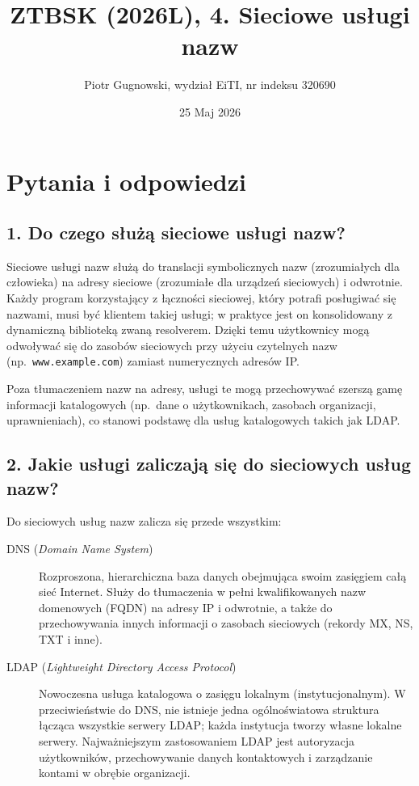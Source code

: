 \documentclass[12pt,a4paper]{article}
\title{ZTBSK (2026L), 4. Sieciowe usługi nazw}
\author{Piotr Gugnowski, wydział EiTI, nr indeksu 320690}
\date{25 Maj 2026}
\begin{document}
\maketitle

\section*{Pytania i odpowiedzi}

\subsection*{1. Do czego służą sieciowe usługi nazw?}

Sieciowe usługi nazw służą do translacji symbolicznych nazw (zrozumiałych dla
człowieka) na adresy sieciowe (zrozumiałe dla urządzeń sieciowych) i odwrotnie.
Każdy program korzystający z łączności sieciowej, który potrafi posługiwać się
nazwami, musi być klientem takiej usługi; w praktyce jest on konsolidowany
z dynamiczną biblioteką zwaną resolverem. Dzięki temu użytkownicy mogą odwoływać
się do zasobów sieciowych przy użyciu czytelnych nazw (np.\ \texttt{www.example.com})
zamiast numerycznych adresów IP.

Poza tłumaczeniem nazw na adresy, usługi te mogą przechowywać szerszą gamę
informacji katalogowych (np.\ dane o użytkownikach, zasobach organizacji,
uprawnieniach), co stanowi podstawę dla usług katalogowych takich jak LDAP.

\subsection*{2. Jakie usługi zaliczają się do sieciowych usług nazw?}

Do sieciowych usług nazw zalicza się przede wszystkim:

\begin{description}
  \item[DNS (\emph{Domain Name System})]
        Rozproszona, hierarchiczna baza danych obejmująca swoim zasięgiem całą
        sieć Internet. Służy do tłumaczenia w pełni kwalifikowanych nazw domenowych
        (FQDN) na adresy IP i odwrotnie, a także do przechowywania innych informacji
        o zasobach sieciowych (rekordy MX, NS, TXT i inne).
  \item[LDAP (\emph{Lightweight Directory Access Protocol})]
        Nowoczesna usługa katalogowa o zasięgu lokalnym (instytucjonalnym).
        W przeciwieństwie do DNS, nie istnieje jedna ogólnoświatowa struktura łącząca
        wszystkie serwery LDAP; każda instytucja tworzy własne lokalne serwery.
        Najważniejszym zastosowaniem LDAP jest autoryzacja użytkowników,
        przechowywanie danych kontaktowych i zarządzanie kontami w obrębie organizacji.
\end{description}
\end{document}
